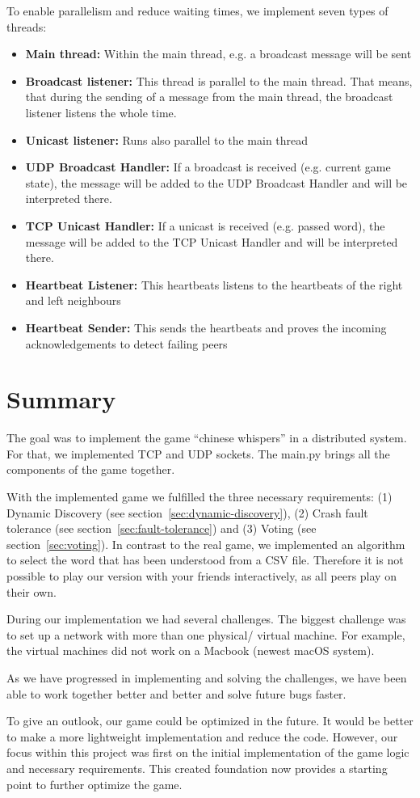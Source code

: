 \documentclass[runningheads]{llncs}
\begin{document}
    To enable parallelism and reduce waiting times, we implement seven types of threads:
    \begin{itemize}
        \item \textbf{Main thread:} Within the main thread, e.g. a broadcast message will be sent
        \item \textbf{Broadcast listener:} This thread is parallel to the main thread. That means, that during the sending of a message from the main thread, the broadcast listener listens the whole time.
        \item \textbf{Unicast listener:} Runs also parallel to the main thread
        \item \textbf{UDP Broadcast Handler:} If a broadcast is received (e.g. current game state), the message will be added to the UDP Broadcast Handler and will be interpreted there. 
        \item \textbf{TCP Unicast Handler:} If a unicast is received (e.g. passed word), the message will be added to the TCP Unicast Handler and will be interpreted there.
        \item \textbf{Heartbeat Listener:} This heartbeats listens to the heartbeats of the right and left neighbours
        \item \textbf{Heartbeat Sender:} This sends the heartbeats and proves the incoming acknowledgements to detect failing peers
    \end{itemize}
    
\section{Summary}
    The goal was to implement the game \enquote{chinese whispers} in a distributed system. For that, we implemented TCP and UDP sockets. The main.py brings all the components of the game together.
    
    With the implemented game we fulfilled the three necessary requirements: (1) Dynamic Discovery (see section~\ref{sec:dynamic-discovery}), (2) Crash fault tolerance (see section~\ref{sec:fault-tolerance}) and (3) Voting (see section~\ref{sec:voting}). In contrast to the real game, we implemented an algorithm to select the word that has been understood from a CSV file. Therefore it is not possible to play our version with your friends interactively, as all peers play on their own.
    
    During our implementation we had several challenges. The biggest challenge was to set up a network with more than one physical/ virtual machine. For example, the virtual machines did not work on a Macbook (newest macOS system). 
    
    As we have progressed in implementing and solving the challenges, we have been able to work together better and better and solve future bugs faster.
    
    To give an outlook, our game could be optimized in the future. It would be better to make a more lightweight implementation and reduce the code. However, our focus within this project was first on the initial implementation of the game logic and necessary requirements. This created foundation now provides a starting point to further optimize the game.
\end{document}
